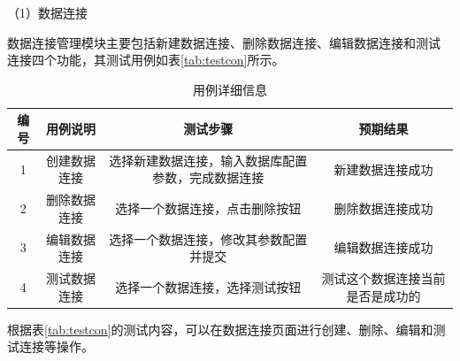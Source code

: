 （1）数据连接

数据连接管理模块主要包括新建数据连接、删除数据连接、编辑数据连接和测试
连接四个功能，其测试用例如表\ref{tab:testcon}所示。
\begin{table}[h!]
    \renewcommand{\arraystretch}{1.5}
    \centering
    \begin{tabular}{|c|c|c|c|}
        \hline
        编号 & 用例说明 &  测试步骤 & 预期结果 \\
        \hline
        1 & 创建数据连接 &  选择新建数据连接，输入数据库配置参数，完成数据连接 & 新建数据连接成功 \\
        \hline
        2 & 删除数据连接 & 选择一个数据连接，点击删除按钮 & 删除数据连接成功\\
        \hline
        3 & 编辑数据连接 & 选择一个数据连接，修改其参数配置并提交 & 编辑数据连接成功 \\
        \hline
        4 & 测试数据连接 & 选择一个数据连接，选择测试按钮 & 测试这个数据连接当前是否是成功的 \\
    \end{tabular}
    \caption{用例详细信息}
\end{table}
根据表\ref{tab:testcon}的测试内容，可以在数据连接页面进行创建、删除、编辑和测试连接等操作。





